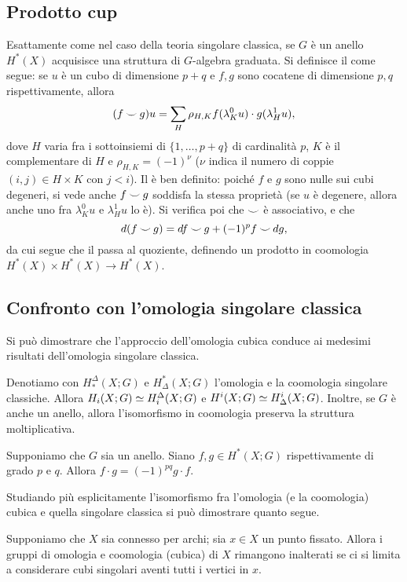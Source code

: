 \subsection{Prodotto cup}\label{cubic-homology:cup-product}
Esattamente come nel caso della teoria singolare classica, se $G$ è un anello $H^*(X)$ acquisisce una struttura di $G$-algebra graduata. Si definisce il \cupproduct{} come segue: se $u$ è un cubo di dimensione $p+q$ e $f,g$ sono cocatene di dimensione $p,q$ rispettivamente, allora
$$
(f\mathbin{\smile} g)u=\sum_H\rho_{H,K}f(\lambda^0_Ku)\cdot g(\lambda^1_Hu),
$$
dove $H$ varia fra i sottoinsiemi di $\{1,\ldots,p+q\}$ di cardinalità $p$, $K$ è il complementare di $H$ e $\rho_{H,K}=(-1)^\nu$ ($\nu$ indica il numero di coppie $(i,j)\in H\times K$ con $j<i$). Il \cupproduct{} è ben definito: poiché $f$ e $g$ sono nulle sui cubi degeneri, si vede anche $f\mathbin{\smile} g$ soddisfa la stessa proprietà (se $u$ è degenere, allora anche uno fra $\lambda^0_Ku$ e $\lambda^1_Hu$ lo è). Si verifica poi che $\mathbin{\smile}$ è associativo, e che
$$
d(f\mathbin{\smile} g)=df\mathbin{\smile} g+(-1)^pf\mathbin{\smile} dg,
$$
da cui segue che il \cupproduct{} passa al quoziente, definendo un prodotto in coomologia $H^*(X)\times H^*(X)\to H^*(X)$.

\subsection{Confronto con l'omologia singolare classica}\label{cubic-homology:comparison}
Si può dimostrare che l'approccio dell'omologia cubica conduce ai medesimi risultati dell'omologia singolare classica.

\begin{proposition}
Denotiamo con $H_*^\Delta(X;G)$ e $H^*_\Delta(X;G)$ l'omologia e la coomologia singolare classiche. Allora $H_i(X;G)\simeq H_i^\Delta(X;G)$ e $H^i(X;G)\simeq H_\Delta^i(X;G)$. Inoltre, se $G$ è anche un anello, allora l'isomorfismo in coomologia preserva la struttura moltiplicativa.
\end{proposition}
\begin{corollary}
Supponiamo che $G$ sia un anello. Siano $f,g\in H^*(X;G)$ rispettivamente di grado $p$ e $q$. Allora $f\cdot g=(-1)^{pq}g\cdot f$.
\end{corollary}
Studiando più esplicitamente l'isomorfismo fra l'omologia (e la coomologia) cubica e quella singolare classica si può dimostrare quanto segue.
\begin{proposition}
Supponiamo che $X$ sia connesso per archi; sia $x\in X$ un punto fissato. Allora i gruppi di omologia e coomologia (cubica)  di $X$ rimangono inalterati se ci si limita a considerare cubi singolari aventi tutti i vertici in $x$.
\end{proposition}

